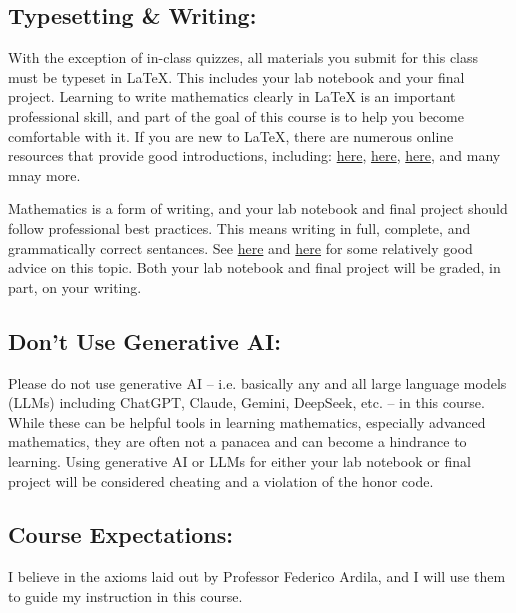 \documentclass[11pt,letterpaper]{article}
\begin{document}
\subsection*{Typesetting \& Writing:}

With the exception of in-class quizzes, all materials you submit for this class must be typeset in LaTeX. This includes your lab notebook and your final project. Learning to write mathematics clearly in LaTeX is an important professional skill, and part of the goal of this course is to help you become comfortable with it. If you are new to LaTeX, there are numerous online resources that provide good introductions, including: \href{https://www.overleaf.com/learn/latex/Learn\_LaTeX\_in\_30\_minutes}{here}, \href{https://www.overleaf.com/learn/latex/Learn\_LaTeX\_in\_30\_minutes}{here}, \href{https://www.math.cmu.edu/~cnewstea/teaching/old/teaching/21-128-F15/latex-handout.pdf}{here}, and many mnay more.

Mathematics is a form of writing, and your lab notebook and final project should follow professional best practices. This means writing in full, complete, and grammatically correct sentances. See \href{https://math.mit.edu/~poonen/papers/writing.pdf}{here} and \href{https://www.math.ucla.edu/~pak/papers/how-to-write1.pdf}{here} for some relatively good advice on this topic. Both your lab notebook and final project will be graded, in part, on your writing.

\subsection*{Don't Use Generative AI:}

Please do not use generative AI -- i.e. basically any and all large language models (LLMs) including ChatGPT, Claude, Gemini, DeepSeek, etc. -- in this course. While these can be helpful tools in learning mathematics, especially advanced mathematics, they are often not a panacea and can become a hindrance to learning. Using generative AI or LLMs for either your lab notebook or final project will be considered cheating and a violation of the honor code.

\subsection*{Course Expectations:}

I believe in the axioms laid out by Professor Federico Ardila, and I will use them to guide my instruction in this course.
\end{document}
